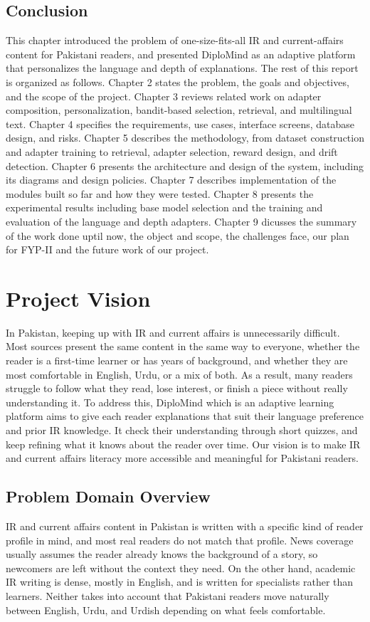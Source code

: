 \documentclass{FastFyp}
\begin{document}
\section{Conclusion}
This chapter introduced the problem of one-size-fits-all IR and current-affairs content for Pakistani readers, and presented DiploMind as an adaptive platform that personalizes the language and depth of explanations. The rest of this report is organized as follows. Chapter 2 states the problem, the goals and objectives, and the scope of the project. Chapter 3 reviews related work on adapter composition, personalization, bandit-based selection, retrieval, and multilingual text. Chapter 4 specifies the requirements, use cases, interface screens, database design, and risks. Chapter 5 describes the methodology, from dataset construction and adapter training to retrieval, adapter selection, reward design, and drift detection. Chapter 6 presents the architecture and design of the system, including its diagrams and design policies. Chapter 7 describes implementation of the modules built so far and how they were tested. Chapter 8 presents the experimental results including base model selection and the training and evaluation of the language and depth adapters. Chapter 9 dicusses the summary of the work done uptil now, the object and scope, the challenges face, our plan for FYP-II and the future work of our project. 



\chapter{Project Vision}
In Pakistan, keeping up with IR and current affairs is unnecessarily difficult. Most sources present the same content in the same way to everyone, whether the reader is a first-time learner or has years of background, and whether they are most comfortable in English, Urdu, or a mix of both. As a result, many readers struggle to follow what they read, lose interest, or finish a piece without really understanding it. To address this, DiploMind which is an adaptive learning platform aims to give each reader explanations that suit their language preference and prior IR knowledge. It check their understanding through short quizzes, and keep refining what it knows about the reader over time. Our vision is to make IR and current affairs literacy more accessible and meaningful for Pakistani readers.
\section{Problem Domain Overview}
IR and current affairs content in Pakistan is written with a specific kind of reader profile in mind, and most real readers do not match that profile. News coverage usually assumes the reader already knows the background of a story, so newcomers are left without the context they need. On the other hand, academic IR writing is dense, mostly in English, and is written for specialists rather than learners. Neither takes into account that Pakistani readers move naturally between English, Urdu, and Urdish depending on what feels comfortable.
\end{document}
